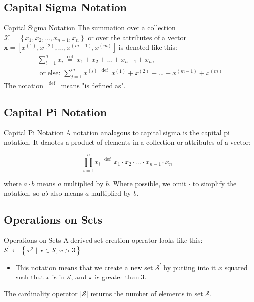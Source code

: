\documentclass[9pt,dvipsnames]{beamer}
\begin{document}
\subsection{Capital Sigma Notation}
\begin{frame}{Capital Sigma Notation}
	The summation over a collection $\mathcal{X}=\left\{x_{1}, x_{2}, \ldots, x_{n-1}, x_{n}\right\}$ or over the attributes of a vector $\mathbf{x}=\left[x^{(1)}, x^{(2)}, \ldots, x^{(m-1)}, x^{(m)}\right]$ is denoted like this:
	\begin{equation*}
			\begin{aligned}
			& \sum_{i=1}^{n} x_{i} \stackrel{\text { def }}{=} x_{1}+x_{2}+\ldots+x_{n-1}+x_{n}, \\ & \text { or else: } \sum_{j=1}^{m} x^{(j)} \stackrel{\text { def }}{=} x^{(1)}+x^{(2)}+\ldots+x^{(m-1)}+x^{(m)}
		\end{aligned}
	\end{equation*}
	The notation $\stackrel{\text { def }}{=}$ means "is defined as".
\end{frame}

\subsection{Capital Pi Notation}
\begin{frame}{Capital Pi Notation}
	A notation analogous to capital sigma is the capital pi notation. It denotes a product of elements in a collection or attributes of a vector:
	
	$$
	\prod_{i=1}^{n} x_{i} \stackrel{\text { def }}{=} x_{1} \cdot x_{2} \cdot \ldots \cdot x_{n-1} \cdot x_{n}
	$$
	
	where $a \cdot b$ means $a$ multiplied by $b$. Where possible, we omit $\cdot$ to simplify the notation, so $a b$ also means $a$ multiplied by $b$.
\end{frame}

\subsection{Operations on Sets}
\begin{frame}{Operations on Sets}
	A derived set creation operator looks like this: $\mathcal{S}^{\prime}\leftarrow\left\{x^{2} \mid x \in \mathcal{S}, x>3\right\}$. 
	\begin{itemize}
		\item This notation means that we create a new set $\mathcal{S}^{\prime}$ by putting into it $x$ squared such that $x$ is in $\mathcal{S}$, and $x$ is greater than 3.
	\end{itemize}
	The cardinality operator $|\mathcal{S}|$ returns the number of elements in set $\mathcal{S}$.
\end{frame}
\end{document}

